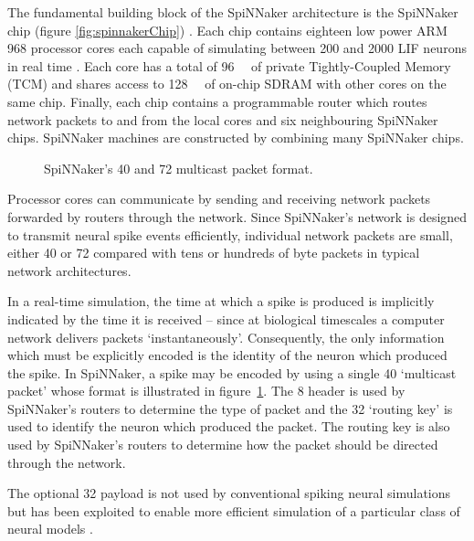 		The fundamental building block of the SpiNNaker architecture is the
		SpiNNaker chip (figure \ref{fig:spinnakerChip}) \cite{furber13}. Each chip
		contains eighteen low power ARM 968 processor cores each capable of
		simulating between \num{200} and \num{2000} LIF neurons in real time
		\cite{mundy15}.  Each core has a total of \SI{96}{\kilo\byte} of private
		Tightly-Coupled Memory (TCM) and shares access to \SI{128}{\mega\byte} of
		on-chip SDRAM with other cores on the same chip. Finally, each chip
		contains a programmable router which routes network packets to and from the
		local cores and six neighbouring SpiNNaker chips. SpiNNaker machines are
		constructed by combining many SpiNNaker chips.
		
		\begin{figure}
			\center
			
			\caption{SpiNNaker's \SI{40}{\bit} and \SI{72}{\bit} multicast packet
			format.}
			\label{fig:spinnaker-packet}
		\end{figure}
		
		Processor cores can communicate by sending and receiving network packets
		forwarded by routers through the network. Since SpiNNaker's network is
		designed to transmit neural spike events efficiently, individual network
		packets are small, either \SI{40}{\bit} or \SI{72}{\bit} compared with tens
		or hundreds of byte packets in typical network architectures.
		
		In a real-time simulation, the time at which a spike is produced is
		implicitly indicated by the time it is received -- since at biological
		timescales a computer network delivers packets `instantaneously'.
		Consequently, the only information which must be explicitly encoded is the
		identity of the neuron which produced the spike. In SpiNNaker, a spike may
		be encoded by using a single \SI{40}{\bit} `multicast packet' whose format
		is illustrated in figure~\ref{fig:spinnaker-packet}.  The \SI{8}{\bit}
		header is used by SpiNNaker's routers to determine the type of packet and
		the \SI{32}{\bit} `routing key' is used to identify the neuron which
		produced the packet. The routing key is also used by SpiNNaker's routers to
		determine how the packet should be directed through the network.
		
		The optional \SI{32}{\bit} payload is not used by conventional spiking
		neural simulations \cite{galluppi10} but has been exploited to enable more
		efficient simulation of a particular class of neural models \cite{mundy15}.
	
